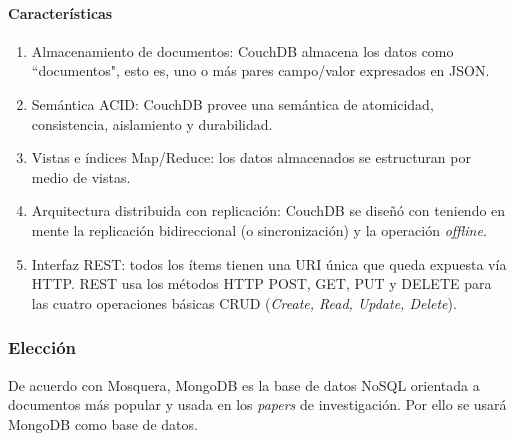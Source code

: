 \paragraph*{Características}
\begin{enumerate}
    \item Almacenamiento de documentos: CouchDB almacena los datos como ``documentos", esto es, uno o más pares campo/valor expresados en JSON. 
    \item Semántica ACID: CouchDB provee una semántica de atomicidad, consistencia, aislamiento y durabilidad.
    \item Vistas e índices Map/Reduce: los datos almacenados se estructuran por medio de vistas. 
    \item Arquitectura distribuida con replicación: CouchDB se diseñó con teniendo en mente la replicación bidireccional (o sincronización) y la operación \textit{offline}. 
    \item Interfaz REST: todos los ítems tienen una URI única que queda expuesta vía HTTP. REST usa los métodos HTTP POST, GET, PUT y DELETE para las cuatro operaciones básicas CRUD (\textit{Create, Read, Update, Delete}).
\end{enumerate}

\subsubsection*{Elección}

De acuerdo con Mosquera\cite{martinez-mosquera_modeling_2020}, MongoDB es la base de datos NoSQL orientada a documentos más popular y usada en los \textit{papers} de investigación. Por ello se usará MongoDB como base de datos.


